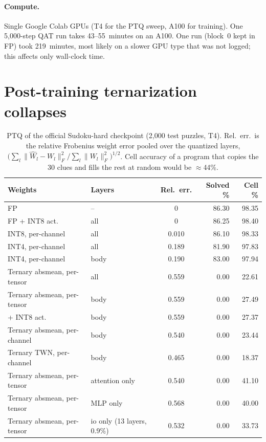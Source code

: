\documentclass[11pt]{article}
\begin{document}
\paragraph{Compute.}
Single Google Colab GPUs (T4 for the PTQ sweep, A100 for training). One 5,000-step QAT run takes 43--55~minutes on
an A100. One run (block~0 kept in FP) took 219~minutes, most likely on a slower GPU type that was not logged; this
affects only wall-clock time.

\section{Post-training ternarization collapses}
\label{sec:ptq}

\begin{table}[t]
\centering
\caption{PTQ of the official Sudoku-hard checkpoint (2,000 test puzzles, T4). Rel.\ err.\ is the relative
Frobenius weight error pooled over the quantized layers, $\big(\sum_l\|\widehat W_l-W_l\|_F^2/\sum_l\|W_l\|_F^2\big)^{1/2}$.
Cell accuracy of a program that copies the 30 clues and fills the rest at random would be $\approx$44\%.}
\label{tab:ptq}
\small
\begin{tabular}{llcrr}
\toprule
Weights & Layers & Rel.\ err. & Solved \% & Cell \% \\
\midrule
FP                         & --   & 0     & 86.30 & 98.35 \\
FP + INT8 act.             & all  & 0     & 86.25 & 98.40 \\
INT8, per-channel          & all  & 0.010 & 86.10 & 98.33 \\
INT4, per-channel          & all  & 0.189 & 81.90 & 97.83 \\
INT4, per-channel          & body & 0.190 & 83.00 & 97.94 \\
\midrule
Ternary absmean, per-tensor & all  & 0.559 & 0.00 & 22.61 \\
Ternary absmean, per-tensor & body & 0.559 & 0.00 & 27.49 \\
\quad + INT8 act.           & body & 0.559 & 0.00 & 27.37 \\
Ternary absmean, per-channel & body & 0.540 & 0.00 & 23.44 \\
Ternary TWN, per-channel    & body & 0.465 & 0.00 & 18.37 \\
Ternary absmean, per-tensor & attention only & 0.540 & 0.00 & 41.10 \\
Ternary absmean, per-tensor & MLP only       & 0.568 & 0.00 & 40.00 \\
Ternary absmean, per-tensor & io only (13 layers, 0.9\%) & 0.532 & 0.00 & 33.73 \\
\bottomrule
\end{tabular}
\end{table}
\end{document}
